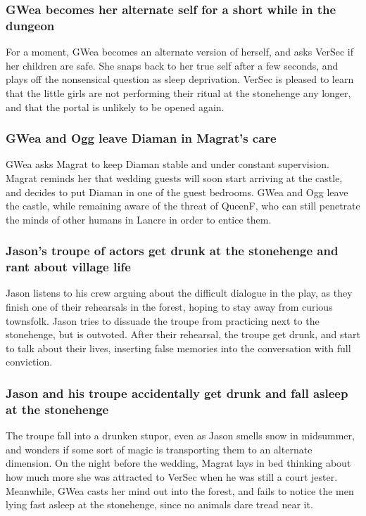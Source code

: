\subsubsection{\Gls{GWea} becomes her alternate self for a short while in the dungeon}
For a moment, \Gls{GWea} becomes an alternate version of herself, and asks \Gls{VerSec} if her
children are safe. She snaps back to her true self after a few seconds, and plays off the
nonsensical question as sleep deprivation. \Gls{VerSec} is pleased to learn that the little girls
are not performing their ritual at the stonehenge any longer, and that the portal is unlikely to
be opened again.

\subsubsection{\Gls{GWea} and \Gls{Ogg} leave \Gls{Diaman} in \Gls{Magrat}'s care}
\Gls{GWea} asks \Gls{Magrat} to keep \Gls{Diaman} stable and under constant supervision.
\Gls{Magrat} reminds her that wedding guests will soon start arriving at the castle, and decides to
put \Gls{Diaman} in one of the guest bedrooms. \Gls{GWea} and \Gls{Ogg} leave the castle, while
remaining aware of the threat of \Gls{QueenF}, who can still penetrate the minds of other humans in
Lancre in order to entice them.

\subsubsection{\Gls{Jason}'s troupe of actors get drunk at the stonehenge and rant about village
    life}
\Gls{Jason} listens to his crew arguing about the difficult dialogue in the play, as they finish
one of their rehearsals in the forest, hoping to stay away from curious townsfolk. \Gls{Jason}
tries to dissuade the troupe from practicing next to the stonehenge, but is outvoted. After their
rehearsal, the troupe get drunk, and start to talk about their lives, inserting false memories into
the conversation with full conviction.

\subsubsection{\Gls{Jason} and his troupe accidentally get drunk and fall asleep at the stonehenge}
The troupe fall into a drunken stupor, even as \Gls{Jason} smells snow in midsummer, and wonders if
some sort of magic is transporting them to an alternate dimension. On the night before the wedding,
\Gls{Magrat} lays in bed thinking about how much more she was attracted to \Gls{VerSec} when he was
still a court jester. Meanwhile, \Gls{GWea} casts her mind out into the forest, and fails to notice
the men lying fast asleep at the stonehenge, since no animals dare tread near it.


